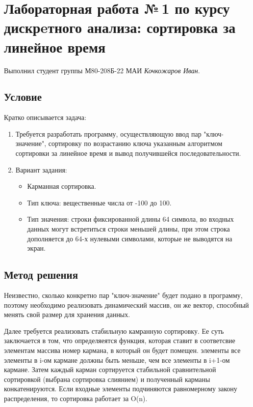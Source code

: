 \documentclass[12pt]{article}
\begin{document}
\section*{Лабораторная работа №\,1 по курсу дискрeтного анализа: сортировка за линейное время}

Выполнил студент группы М80-208Б-22 МАИ \textit{Кочкожаров Иван}.

\subsection*{Условие}

Кратко описывается задача:
\begin{enumerate}
\item
    Требуется разработать программу, осуществляющую ввод пар "ключ-значение", сортировку по возрастанию ключа указанным алгоритмом сортировки за линейное время и вывод получившейся последовательности.
\item
    Вариант задания:
        \begin{itemize}
            \item Карманная сортировка.
            \item Тип ключа: вещественные числа от -100 до 100.
            \item Тип значения: строки фиксированной длины 64 символа, во входных данных могут встретиться строки меньшей длины, при этом строка дополняется до 64-х нулевыми символами, которые не выводятся на экран.
        \end{itemize}
\end{enumerate}

\subsection*{Метод решения}

Неизвестно, сколько конкретно пар "ключ-значение" будет подано в программу, поэтому необходимо реализовать динамический массив, он же вектор, способный менять свой размер для хранения данных.
\par Далее требуется реализовать стабильную камранную сортировку. Ее суть заключается в том, что определяеятся функция, которая ставит в соответсвие элементам массива номер кармана, в который он будет помещен.
элементы все элементы в i-ом кармане должны быть меньше, чем все элементы в i+1-ом кармане. Затем каждый карман сортируется стабильной сравнительной сортировкой (выбрана сортировка слиянием) и полученный карманы конкатенируются.
Если входные элементы подчиняются равномерному закону распределения, то сортировка работает за O(n).
\end{document}
